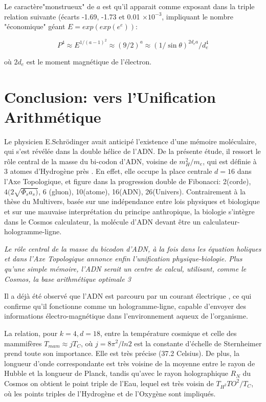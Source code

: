 \documentclass[a4paper,9pt]{article}
\begin{document}
Le caractère"monstrueux" de $a$ est qu'il apparait comme exposant dans la triple relation suivante (écarts -1.69, -1.73 et 0.01 $\times 10^{-3}$, impliquant le nombre "économique" géant  $ E = exp(exp(e^e))$:

\begin{equation}
  P^4  \approx E^{1/(a-1)^2} \approx (9/2)^a \approx (1/\sin \theta)^{2d_ea}/d_e^4 
\end{equation}

où $2d_e$ est le moment magnétique de l'électron.








 
 
 
 
 
 
\section{Conclusion: vers l'Unification Arithmétique}

Le physicien E.Schrödinger \cite{Schroedinger} avait anticipé l'existence d'une mémoire moléculaire, qui s'est révélée dans la double hélice de l'ADN. De la présente étude, il ressort le rôle central de la masse du bi-codon d'ADN, voisine de $m_H^2/m_e$, qui est définie à 3 atomes d'Hydrogène près \cite{Sanchez3}. En effet, elle occupe la place centrale $d = 16$ dans l'Axe Topologique, et figure dans la progression double de Fibonacci: 2(corde), $4(2\sqrt{\Phi_s a_s)}$, 6 (gluon), 10(atome), 16(ADN), 26(Univers). 
Contrairement à la thèse du Multivers, basée sur une indépendance entre lois physiques et biologique et sur une mauvaise interprétation du principe anthropique, la biologie s'intègre dans le Cosmos calculateur, la molécule d'ADN devant être un calculateur-hologramme-ligne.


\textit{Le rôle central de la masse du bicodon d'ADN, à la fois dans les équation holiques et dans l'Axe Topologique annonce enfin l'unification physique-biologie.} 
\textit{Plus qu'une simple mémoire, l'ADN serait un centre de calcul, utilisant, comme le Cosmos, la base arithmétique optimale 3}

Il a déjà été observé que l'ADN est parcouru par un courant électrique \cite{Montagnier}, ce qui confirme qu'il fonctionne comme un hologramme-ligne, capable d'envoyer des informations électro-magnétique dans l'environnement aqueux de l'organisme.

La relation, pour $k = 4, d= 18$, entre la température cosmique et celle des mammifères $T_{mam}\approx jT_C$, où $j = 8 \pi^2/ln2$ est la constante d'échelle de Sternheimer \cite {Sternheimer} prend toute son importance. Elle est très précise (37.2 Celsius). De plus, la longueur d'onde correspondante est très voisine de la moyenne entre le rayon de Hubble et la longueur de Planck, tandis qu'avec le rayon holographique $R_N$ du Cosmos on obtient le point triple de l'Eau, lequel est très voisin de $T_{H^2}T{O^2}/T_C$, où les points triples de l'Hydrogène et de l'Oxygène sont impliqués.
\end{document}
